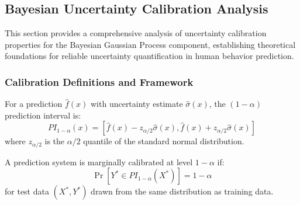 \subsection{Bayesian Uncertainty Calibration Analysis}

This section provides a comprehensive analysis of uncertainty calibration properties for the Bayesian Gaussian Process component, establishing theoretical foundations for reliable uncertainty quantification in human behavior prediction.

\subsubsection{Calibration Definitions and Framework}

\begin{definition}
\label{def:prediction_intervals}
For a prediction $\hat{f}(x)$ with uncertainty estimate $\hat{\sigma}(x)$, the $(1-\alpha)$ prediction interval is:
$$PI_{1-\alpha}(x) = \left[\hat{f}(x) - z_{\alpha/2}\hat{\sigma}(x), \hat{f}(x) + z_{\alpha/2}\hat{\sigma}(x)\right]$$
where $z_{\alpha/2}$ is the $\alpha/2$ quantile of the standard normal distribution.
\end{definition}

\begin{definition}
\label{def:marginal_calibration}
A prediction system is marginally calibrated at level $1-\alpha$ if:
$$\Pr[Y^* \in PI_{1-\alpha}(X^*)] = 1-\alpha$$
for test data $(X^*, Y^*)$ drawn from the same distribution as training data.
\end{definition}


